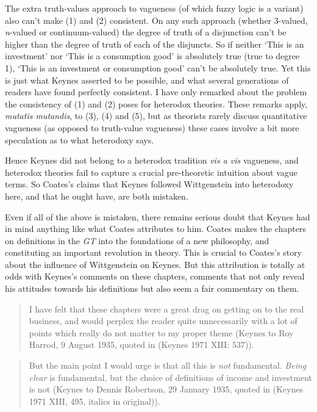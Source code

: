 \documentclass[noflushend]{philosophersimprint}
\begin{document}
The extra truth-values approach to vagueness (of which fuzzy logic is a
variant) also can't make (1) and (2) consistent. On any such approach
(whether 3-valued, \emph{n}-valued or continuum-valued) the degree of
truth of a disjunction can't be higher than the degree of truth of each
of the disjuncts. So if neither `This is an investment' nor `This is a
consumption good' is absolutely true (true to degree 1), `This is an
investment or consumption good' can't be absolutely true. Yet this is
just what Keynes asserted to be possible, and what several generations
of readers have found perfectly consistent. I have only remarked about
the problem the consistency of (1) and (2) poses for heterodox theories.
These remarks apply, \emph{mutatis mutandis}, to (3), (4) and (5), but
as theorists rarely discuss quantitative vagueness (as opposed to
truth-value vagueness) these cases involve a bit more speculation as to
what heterodoxy says.

Hence Keynes did not belong to a heterodox tradition \emph{vis a vis}
vagueness, and heterodox theories fail to capture a crucial
pre-theoretic intuition about vague terms. So Coates's claims that
Keynes followed Wittgenstein into heterodoxy here, and that he ought
have, are both mistaken.

Even if all of the above is mistaken, there remains serious doubt that
Keynes had in mind anything like what Coates attributes to him. Coates
makes the chapters on definitions in the \emph{GT} into the foundations
of a new philosophy, and constituting an important revolution in theory.
This is crucial to Coates's story about the influence of Wittgenstein on
Keynes. But this attribution is totally at odds with Keynes's comments
on these chapters, comments that not only reveal his attitudes towards
his definitions but also seem a fair commentary on them.

\begin{quote}
I have felt that these chapters were a great drag on getting on to the
real business, and would perplex the reader quite unnecessarily with a
lot of points which really do not matter to my proper theme (Keynes to
Roy Harrod, 9 August 1935, quoted in (Keynes 1971 XIII: 537)).
\end{quote}

\begin{quote}
But the main point I would urge is that all this is \emph{not}
fundamental. \emph{Being clear} is fundamental, but the choice of
definitions of income and investment is not (Keynes to Dennis Robertson,
29 January 1935, quoted in (Keynes 1971 XIII, 495, italics in
original)).
\end{quote}
\end{document}
